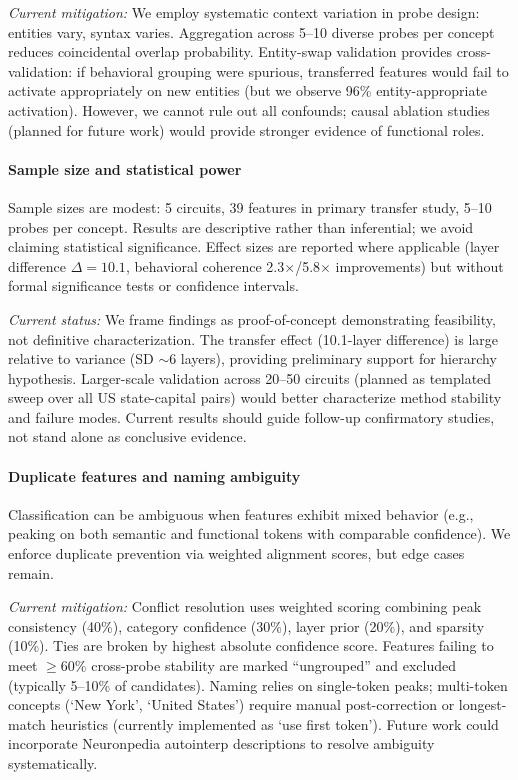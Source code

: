 \emph{Current mitigation:} We employ systematic context variation in probe design: entities vary, syntax varies. Aggregation across 5--10 diverse probes per concept reduces coincidental overlap probability. Entity-swap validation provides cross-validation: if behavioral grouping were spurious, transferred features would fail to activate appropriately on new entities (but we observe 96\% entity-appropriate activation). However, we cannot rule out all confounds; causal ablation studies (planned for future work) would provide stronger evidence of functional roles.

\paragraph{Sample size and statistical power}
Sample sizes are modest: 5 circuits, 39 features in primary transfer study, 5--10 probes per concept. Results are descriptive rather than inferential; we avoid claiming statistical significance. Effect sizes are reported where applicable (layer difference $\Delta=10.1$, behavioral coherence 2.3$\times$/5.8$\times$ improvements) but without formal significance tests or confidence intervals.

\emph{Current status:} We frame findings as proof-of-concept demonstrating feasibility, not definitive characterization. The transfer effect (10.1-layer difference) is large relative to variance (SD $\sim$6 layers), providing preliminary support for hierarchy hypothesis. Larger-scale validation across 20--50 circuits (planned as templated sweep over all US state-capital pairs) would better characterize method stability and failure modes. Current results should guide follow-up confirmatory studies, not stand alone as conclusive evidence.

\paragraph{Duplicate features and naming ambiguity}
Classification can be ambiguous when features exhibit mixed behavior (e.g., peaking on both semantic and functional tokens with comparable confidence). We enforce duplicate prevention via weighted alignment scores, but edge cases remain.

\emph{Current mitigation:} Conflict resolution uses weighted scoring combining peak consistency (40\%), category confidence (30\%), layer prior (20\%), and sparsity (10\%). Ties are broken by highest absolute confidence score. Features failing to meet $\ge$60\% cross-probe stability are marked ``ungrouped'' and excluded (typically 5--10\% of candidates). Naming relies on single-token peaks; multi-token concepts (`New York', `United States') require manual post-correction or longest-match heuristics (currently implemented as `use first token'). Future work could incorporate Neuronpedia autointerp descriptions to resolve ambiguity systematically.

